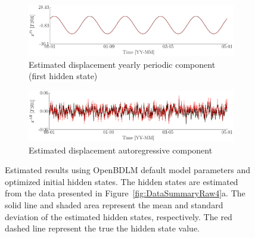 \begin{figure}[h!]
\ContinuedFloat
\begin{subfigure}{\linewidth}
\includegraphics[width=0.9\linewidth]{./docfigs/Example_SYNTHETIC/optim_param_optim_initialhiddenstate/TS01_S1_4.pdf}
\caption{Estimated displacement yearly periodic component (first hidden state)}
\end{subfigure}
\begin{subfigure}{\linewidth}
\includegraphics[width=0.9\linewidth]{./docfigs/Example_SYNTHETIC/optim_param_optim_initialhiddenstate/TS01_AR_6.pdf} 
\caption{Estimated displacement autoregressive component}
\end{subfigure}
\caption{Estimated results using OpenBDLM default model parameters and optimized initial hidden states. The hidden states are estimated from the data presented in Figure~\ref{fig:DataSummaryRaw4}a. The solid line and shaded area represent the mean and standard deviation of the estimated hidden states, respectively. The red dashed line represent the true the hidden state value.}
\label{fig:SYNTHETICOptimizedOptimizedExample4}
\end{figure}


